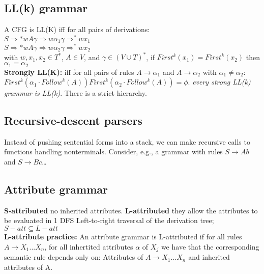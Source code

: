\subsection*{LL(k) grammar}
A CFG is LL(K) iff for all pairs of derivations:\\
$S \Rightarrow* wA\gamma \Rightarrow w\alpha_1\gamma \Rightarrow^* wx_1$\\
$S \Rightarrow* wA\gamma \Rightarrow w\alpha_2\gamma \Rightarrow^* wx_2$\\
with $w,x_1,x_2\in T^*$, $A \in V$, and $\gamma \in (V \cup T)^*$, if $First^k(x_1) = First^k(x_2)$ then $\alpha_1 = \alpha_2$\\
\textbf{Strongly LL(K):} iff for all pairs of rules $A \rightarrow \alpha_1$ and $A \rightarrow \alpha_2$ with $\alpha_1 \neq \alpha_2$: $First^k(\alpha_1\cdot Follow^k(A))$$First^k(\alpha_2\cdot Follow^k(A))$$=\phi$. \textit{every strong LL(k) grammar is LL(k)}. There is a strict hierarchy.
\subsection*{Recursive-descent parsers}
Instead of pushing sentential forms into a stack, we can make recursive
calls to functions handling nonterminals. Consider, e.g., a grammar with rules $S \rightarrow Ab$ and $S \rightarrow Bc$\ldots
\subsection*{Attribute grammar}
\textbf{S-attributed} no inherited attributes. \textbf{L-attributed} they allow the attributes to be evaluated in 1 DFS Left-to-right traversal of the derivation tree; $S-att \subseteq L-att$\\
\textbf{L-attribute practice:} An attribute grammar is L-attributed if for all rules $A \rightarrow X_1...X_n$, for all inhertited attributes $\alpha$ of $X_j$ we have that the corresponding semantic rule depends only on: Attributes of $A \rightarrow X_1...X_n$ and inherited attributes of A.
